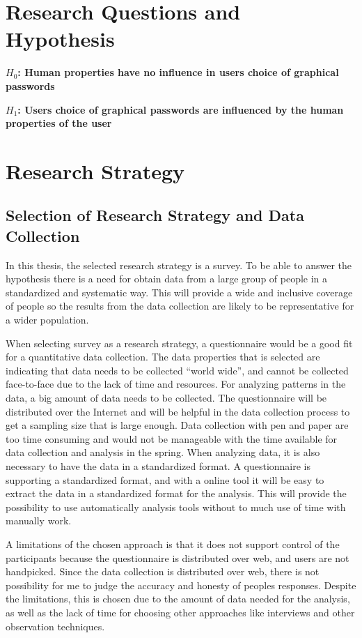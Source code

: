 \section{Research Questions and Hypothesis}
    
  {\bf $H_{0}$: Human properties have no influence in users choice of graphical passwords} 

  {\bf $H_{1}$: Users choice of graphical passwords are influenced by the human properties of the user}

\section{Research Strategy}

  \subsection{Selection of Research Strategy and Data Collection}

    In this thesis, the selected research strategy is a survey. To be able to answer the hypothesis there is a need for obtain data from a large group of people in a standardized and systematic way. This will provide a wide and inclusive coverage of people so the results from the data collection are likely to be representative for a wider population. 

    When selecting survey as a research strategy, a questionnaire would be a good fit for a quantitative data collection. The data properties that is selected are indicating that data needs to be collected ``world wide'', and cannot be collected face-to-face due to the lack of time and resources. For analyzing patterns in the data, a big amount of data needs to be collected. The questionnaire will be distributed over the Internet and will be helpful in the data collection process to get a sampling size that is large enough. Data collection with pen and paper are too time consuming and would not be manageable with the time available for data collection and analysis in the spring. When analyzing data, it is also necessary to have the data in a standardized format. A questionnaire is supporting a standardized format, and with a online tool it will be easy to extract the data in a standardized format for the analysis. This will provide the possibility to use automatically analysis tools without to much use of time with manually work.

    A limitations of the chosen approach is that it does not support control of the participants because the questionnaire is distributed over web, and users are not handpicked. Since the data collection is distributed over web, there is not possibility for me to judge the accuracy and honesty of peoples responses. Despite the limitations, this is chosen due to the amount of data needed for the analysis, as well as the lack of time for choosing other approaches like interviews and other observation techniques. 

